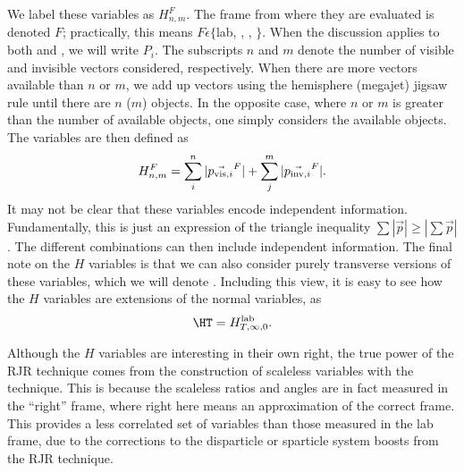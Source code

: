 We label these variables as $H_{n,m}^F$.%
The frame from where they are evaluated is denoted $F$; practically, this means $F \epsilon \{$lab, \PP, \Pa, \Pb$\}$.
When the discussion applies to both \Pa and \Pb, we will write $P_i$.
The subscripts $n$ and $m$ denote the number of visible and invisible vectors considered, respectively.
When there are more vectors available than $n$ or $m$, we add up vectors using the hemisphere (megajet) jigsaw rule until there are $n$ ($m$) objects.\footnotemark
{}
In the opposite case, where $n$ or $m$ is greater than the number of available objects, one simply considers the available objects.
The  variables are then defined as
\begin{align}
H^{{F}}_{n,m} = \sum_i^n | \vec{p_{\text{vis},i}}^F | + \sum_j^m | \vec{p_{\text{inv},i}}^F |.
\end{align}
It may not be clear that these variables encode independent information.
Fundamentally, this is just an expression of the triangle inequality $\sum |\vec{p}| \geq |\sum \vec{p}|$.
The different combinations can then include independent information.
The final note on the $H$ variables is that we can also consider purely transverse versions of these variables, which we will denote .
Including this view, it is easy to see how the $H$ variables are extensions of the normal \HT variables, as
\begin{align}
\HT = \HTFnm{\text{lab}}{\infty}{0}.
\end{align}

Although the $H$ variables are interesting in their own right, the true power of the RJR technique comes from the construction of scaleless variables with the technique.
This is because the scaleless ratios and angles are in fact measured in the ``right'' frame, where right here means an approximation of the correct frame.
This provides a less correlated set of variables than those measured in the lab frame, due to the corrections to the disparticle or sparticle system boosts from the RJR technique.

